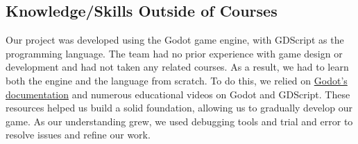 \documentclass{article}
\begin{document}
\subsection{Knowledge/Skills Outside of Courses}

Our project was developed using the Godot game engine, with GDScript as the programming language. The team had no prior experience with game design or development and had not taken any related courses. As a result, we had to learn both the engine and the language from scratch. To do this, we relied on \href{https://docs.godotengine.org/}{Godot's documentation} and numerous educational videos on Godot and GDScript. These resources helped us build a solid foundation, allowing us to gradually develop our game. As our understanding grew, we used debugging tools and trial and error to resolve issues and refine our work.
\end{document}
